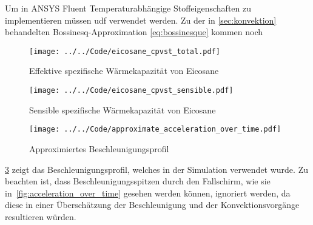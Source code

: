 Um in ANSYS Fluent Temperaturabhängige Stoffeigenschaften zu implementieren müssen \ac{udf} verwendet werden.
Zu der in \ref{sec:konvektion} behandelten Bossinesq-Approximation \ref{eq:bossinesque} kommen noch 

\begin{figure}[H]
  \centering
  \texttt{[image: ../../Code/eicosane\_cpvst\_total.pdf]}
  \caption{Effektive spezifische Wärmekapazität von Eicosane}\label{fig:pcm_effective_cp}
\end{figure}

\begin{figure}[H]
  \centering
  \texttt{[image: ../../Code/eicosane\_cpvst\_sensible.pdf]}
  \caption{Sensible spezifische Wärmekapazität von Eicosane}\label{fig:pcm_sensible_cp}
\end{figure}

\begin{figure}[H]
  \centering
  \texttt{[image: ../../Code/approximate\_acceleration\_over\_time.pdf]}
  \caption{Approximiertes Beschleunigungsprofil}\label{fig:approximierte_beschleunigung}
\end{figure}

\ref{fig:approximierte_beschleunigung} zeigt das Beschleunigungsprofil, welches in der Simulation verwendet wurde. Zu beachten
ist, dass Beschleunigungsspitzen durch den Fallschirm, wie sie in~\ref{fig:acceleration_over_time} gesehen
werden können, ignoriert werden, da diese in einer Überschätzung der Beschleunigung und der Konvektionsvorgänge resultieren würden.


